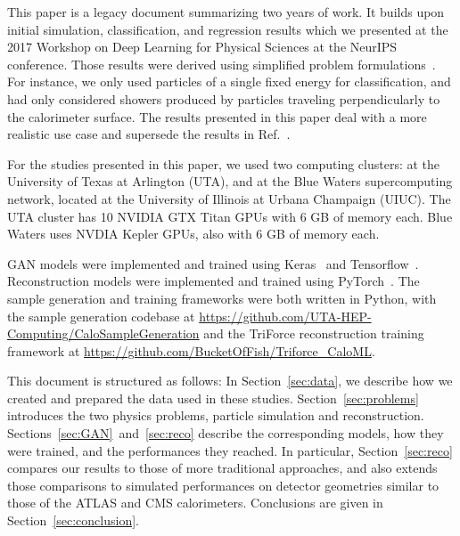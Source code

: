 This paper is a legacy document summarizing two years of work. It builds upon initial simulation, classification, and regression results which we presented at the 2017 Workshop on Deep Learning for Physical Sciences at the NeurIPS conference. Those results were derived using simplified problem formulations~\cite{Mau2017}.  For instance, we only used particles of a single fixed energy for classification, and had only considered showers produced by particles traveling perpendicularly to the calorimeter surface. The results presented in this paper deal with a more realistic use case and supersede the results in Ref.~\cite{Mau2017}. 

For the studies presented in this paper, we used two computing clusters: at the University of Texas at Arlington (UTA), and at the Blue Waters supercomputing network, located at the University of Illinois at Urbana Champaign (UIUC). The UTA cluster has 10 NVIDIA GTX Titan GPUs with 6 GB of memory each. Blue Waters uses NVDIA Kepler GPUs, also with 6 GB of memory each. 

GAN models were implemented and trained using Keras~\cite{keras} and  Tensorflow~\cite{tensorflow2015-whitepaper}. Reconstruction models were implemented and trained using PyTorch~\cite{PyTorch}. The sample generation and training frameworks were both written in Python, with the sample generation codebase at \url{https://github.com/UTA-HEP-Computing/CaloSampleGeneration} and the TriForce reconstruction training framework at \url{https://github.com/BucketOfFish/Triforce_CaloML}.

This document is structured as follows: In Section~\ref{sec:data}, we describe how we created and prepared the data used in these studies. Section~\ref{sec:problems} introduces the two physics problems, particle simulation and reconstruction. Sections~\ref{sec:GAN}~and~\ref{sec:reco} describe the corresponding models, how they were trained, and the performances they reached. In particular, Section~\ref{sec:reco} compares our results to those of more traditional approaches, and also extends those comparisons to simulated performances on detector geometries similar to those of the ATLAS and CMS calorimeters. Conclusions are given in Section~\ref{sec:conclusion}.